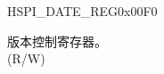 \begin{register}{H}{SPI\_DATE\_REG}{0x00F0}\label{regdesc:SPI3DATEREG}
%
%
\regnewline%
\begin{regdesc}\begin{reglist}
\label{fielddesc:SPI3DATE}\item [SPI\_DATE] 版本控制寄存器。\\
(R/W)
\end{reglist}\end{regdesc}
\end{register}


